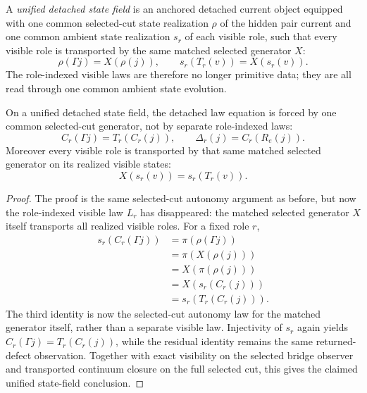 \begin{definition}
\label{def:unified-detached-state-field}
A \emph{unified detached state field} is an anchored detached current object
equipped with one common selected-cut state realization \(\rho\) of the hidden
pair current and one common ambient state realization \(s_r\) of each visible
role, such that every visible role is transported by the same matched selected
generator \(X\):
\[
\rho(\Gamma j)=X(\rho(j)),
\qquad
s_r(T_r(v))=X(s_r(v)).
\]
The role-indexed visible laws are therefore no longer primitive data; they are
all read through one common ambient state evolution.
\end{definition}

\begin{theorem}
\label{thm:unified-state-field-forces-the-detached-flagship-equation}
On a unified detached state field, the detached law equation is forced by
one common selected-cut generator, not by separate role-indexed laws:
\[
C_r(\Gamma j)=T_r(C_r(j)),
\qquad
\Delta_r(j)=C_r(R_e(j)).
\]
Moreover every visible role is transported by that same matched selected
generator on its realized visible states:
\[
X(s_r(v))=s_r(T_r(v)).
\]
\end{theorem}

\begin{proof}
The proof is the same selected-cut autonomy argument as before, but now the
role-indexed visible law \(L_r\) has disappeared: the matched selected
generator \(X\) itself transports all realized visible roles. For a fixed role
\(r\),
\[
\begin{aligned}
s_r(C_r(\Gamma j))
  &= \pi(\rho(\Gamma j)) \\
  &= \pi(X(\rho(j))) \\
  &= X(\pi(\rho(j))) \\
  &= X(s_r(C_r(j))) \\
  &= s_r(T_r(C_r(j))).
\end{aligned}
\]
The third identity is now the selected-cut autonomy law for the matched
generator itself, rather than a separate visible law. Injectivity of \(s_r\)
again yields \(C_r(\Gamma j)=T_r(C_r(j))\), while the residual identity remains
the same returned-defect observation. Together with exact visibility on the
selected bridge observer and transported continuum closure on the full
selected cut, this gives the claimed unified state-field conclusion.
\end{proof}

